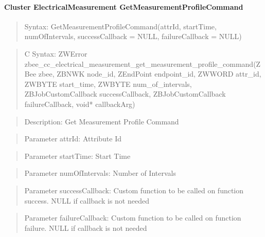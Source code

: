 \paragraph{Cluster ElectricalMeasurement GetMeasurementProfileCommand}
\begin{quote}Syntax: GetMeasurementProfileCommand(attrId, startTime, numOfIntervals, successCallback = NULL, failureCallback = NULL)\end{quote}
\begin{quote}C Syntax: ZWError zbee\_cc\_electrical\_measurement\_get\_measurement\_profile\_command(ZBee zbee, ZBNWK node\_id, ZEndPoint endpoint\_id, ZWWORD attr\_id, ZWBYTE start\_time, ZWBYTE num\_of\_intervals, ZBJobCustomCallback successCallback, ZBJobCustomCallback failureCallback, void* callbackArg)\end{quote}
\begin{quote}Description: Get Measurement Profile Command\end{quote}
\begin{quote}Parameter attrId: Attribute Id\end{quote}
\begin{quote}Parameter startTime: Start Time\end{quote}
\begin{quote}Parameter numOfIntervals: Number of Intervals\end{quote}
\begin{quote}Parameter successCallback: Custom function to be called on function success. NULL if callback is not needed\end{quote}
\begin{quote}Parameter failureCallback: Custom function to be called on function failure. NULL if callback is not needed\end{quote}

